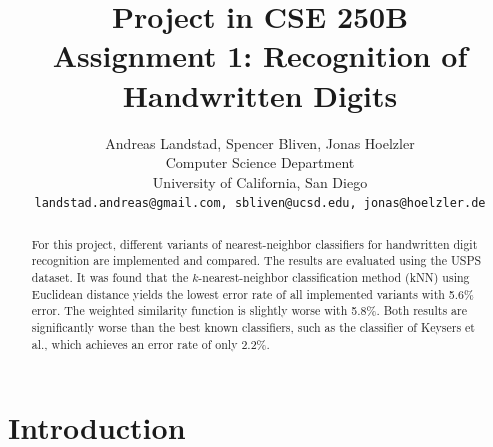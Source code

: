 \documentclass[10pt,twocolumn,letterpaper]{article}
\begin{document}
\title{
Project in CSE 250B\\
Assignment 1: Recognition of Handwritten Digits}

\author{Andreas Landstad, Spencer Bliven, Jonas Hoelzler\\
Computer Science Department\\
University of California, San Diego\\
{\tt\small landstad.andreas@gmail.com, sbliven@ucsd.edu, jonas@hoelzler.de}
}%
\maketitle
\thispagestyle{empty}

\begin{abstract}
For this project, different variants of nearest-neighbor classifiers for handwritten digit recognition are implemented and compared. The results are evaluated using the USPS dataset. It was found that the $k$-nearest-neighbor classification method (kNN) using Euclidean distance yields the lowest error rate of all implemented variants with 5.6\% error.
The weighted similarity function is slightly worse with 5.8\%.   
Both results are significantly worse than the best known classifiers, such as the classifier of Keysers et al., which achieves an error rate of only 2.2\%.
\end{abstract}

\section{Introduction}
\end{document}
